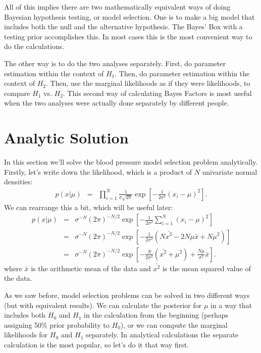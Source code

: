 All of this implies
there are two mathematically equivalent ways of doing Bayesian hypothesis testing,
or model selection. One is to make a big model that includes both the null and
the alternative hypothesis. The Bayes' Box with a testing prior accomplishes this.
In most cases this is the most convenient way to do the calculations.

The other way is to do the two analyses separately. First, do parameter estimation
within the context of $H_1$. Then, do parameter estimation within the context
of $H_2$. Then, use the marginal likelihoods as if they were likelihoods, to
compare $H_1$ vs. $H_2$. This second way of calculating Bayes Factors is
most useful when the two analyses were actually done separately by different
people.

\section{Analytic Solution}
In this section we'll solve the blood pressure model selection problem
analytically. Firstly, let's write down the likelihood,
which is a product of $N$ univariate normal densities:
\begin{eqnarray}
p(x | \mu) &=&
\prod_{i=1}^N \frac{1}{\sigma\sqrt{2\pi}}
\exp
\left[-\frac{1}{2\sigma^2}\left(x_i - \mu\right)^2\right].
\end{eqnarray}
We can rearrange this a bit, which will be useful later:
\begin{eqnarray}
p(x | \mu) &=& \sigma^{-N}(2\pi)^{-N/2}
\exp
\left[-\frac{1}{2\sigma^2}\sum_{i=1}^N\left(x_i - \mu\right)^2\right]\\
&=& \sigma^{-N}(2\pi)^{-N/2}
\exp
\left[-\frac{1}{2\sigma^2}\left(N\bar{x^2} - 2N\mu\bar{x} + N\mu^2\right)\right]\\
&=& \sigma^{-N}(2\pi)^{-N/2}
\exp
\left[-\frac{N}{2\sigma^2}\left(\bar{x^2} + \mu^2\right) + \frac{N\mu}{\sigma^2}\bar{x}\right].\label{eq:lik_simplified}
\end{eqnarray}
where $\bar{x}$ is the arithmetic mean of the data and $\bar{x^2}$ is the mean
squared value of the data.


As we saw before, model selection problems can be solved in two different ways
(but with equivalent results). We can calculate the posterior for $\mu$ in
a way that includes both $H_0$ and $H_1$ in the calculation from the beginning
(perhaps assigning 50\% prior probability to $H_0$), or we can compute the
marginal likelihoods for $H_0$ and $H_1$ separately. In analytical calculations
the separate calculation is the most popular, so let's do it that way first.


